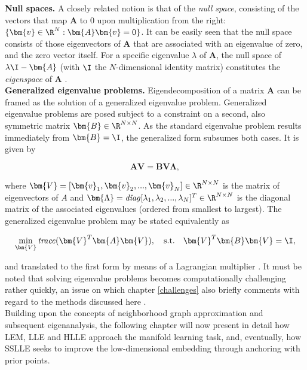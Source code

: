 \textbf{Null spaces.} A closely related notion is that of the 
\textit{null space}, consisting of the vectors that map $\bm{A}$ to 0 upon 
multiplication from the right: $\{\bm{v} \in \R^N: \bm{A} \bm{v} = 0\}$.
It can be easily seen that the null space consists of those eigenvectors of 
$\bm{A}$ that are associated with an eigenvalue of zero, and the zero vector 
itself. 
For a specific eigenvalue $\lambda$ of $\bm{A}$, the null space of 
$\lambda \I - \bm{A}$ 
(with $\I$ the $N$-dimensional identity matrix) constitutes the 
\textit{eigenspace} of $\bm{A}$ \citep{boermmehl2012}.
\\

\textbf{Generalized eigenvalue problems.} Eigendecomposition of a matrix 
$\bm{A}$ can be framed as the solution of a generalized eigenvalue problem.
Generalized eigenvalue problems are posed subject to a constraint on a second, 
also symmetric matrix $\bm{B} \in \R^{N \times N}$.
As the standard eigenvalue problem results immediately from 
$\bm{B} = \I$, the generalized form subsumes both cases.
It is given by 

\begin{equation}
  \bm{A} \bm{V} = \bm{B} \bm{V} \bm{\Lambda},
  \label{eq-gevproblem}
\end{equation}

where $\bm{V} = [\bm{v}_1, \bm{v}_2, ..., \bm{v}_N] \in \R^{N \times N}$ 
is the matrix of eigenvectors of $A$ and 
$\bm{\Lambda} = \text{\textit{diag}}[\lambda_1, \lambda_2, ..., \lambda_N]^T 
\in \R^{N \times N}$ is the diagonal matrix of the associated eigenvalues 
(ordered from smallest to largest).
The generalized eigenvalue problem may be stated equivalently as 

\begin{equation}
  \min_{\bm{V}} \text{\textit{trace}}(\bm{V}^T \bm{A} \bm{V}), \quad \text{s.t.} 
  \quad \bm{V}^T \bm{B} \bm{V} = \I,
  \label{eq-gevproblem-max}
\end{equation}

and translated to the first form by means of a Lagrangian multiplier \citep{ghojoghetal2019}.
It must be noted that solving eigenvalue problems becomes computationally 
challenging rather quickly, an issue on which chapter \ref{challenges} 
also briefly comments with regard to the methods discussed here 
\citep{boermmehl2012}.
\\

Building upon the concepts of neighborhood graph approximation and subsequent 
eigenanalysis, the following chapter will now present in detail how LEM, LLE and 
HLLE approach the manifold learning task, and, eventually, how SSLLE seeks to 
improve the low-dimensional embedding through anchoring with prior points.
